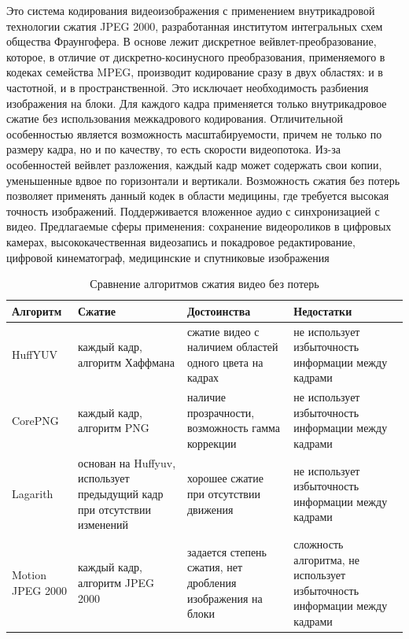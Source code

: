 \begin{itemize}
\begin{enumerate}
Это система кодирования видеоизображения с применением внутрикадровой технологии сжатия JPEG 2000, 
разработанная институтом интегральных схем общества Фраунгофера. 
В основе лежит дискретное вейвлет-преобразование, которое, в отличие от 
дискретно-косинусного преобразования, применяемого в кодеках семейства MPEG, 
производит кодирование сразу в двух областях: и в частотной, и в пространственной. 
Это исключает необходимость разбиения изображения на блоки. Для каждого кадра 
применяется только внутрикадровое сжатие без использования межкадрового кодирования.
Отличительной особенностью является возможность масштабируемости, 
причем не только по размеру кадра, но и по качеству, 
то есть скорости видеопотока. Из-за особенностей вейвлет разложения, каждый 
кадр может содержать свои копии, уменьшенные вдвое по горизонтали и вертикали.
Возможность сжатия без потерь позволяет применять данный кодек в области медицины, 
где требуется высокая точность изображений.
Поддерживается вложенное аудио с синхронизацией с видео.
Предлагаемые сферы применения: сохранение видеороликов в цифровых камерах, 
высококачественная видеозапись и покадровое редактирование, цифровой кинематограф,
медицинские и спутниковые изображения

\end{enumerate}

\begin{table}[ht]\small
  \caption{Сравнение алгоритмов сжатия видео без потерь}
  \begin{tabular}{|p{2cm}|p{3cm}|p{4.5cm}|p{4.5cm}|}
  \hline
  Алгоритм      & Сжатие & Достоинства & Недостатки \\
  \hline
  HuffYUV  & каждый кадр, алгоритм Хаффмана & сжатие видео с наличием областей одного цвета на кадрах & не использует избыточность информации между кадрами         \\
  \hline
  CorePNG       & каждый кадр, алгоритм PNG & наличие прозрачности, возможность гамма коррекции & не использует избыточность информации между кадрами \\
  \hline
  Lagarith   & основан на Huffyuv, использует предыдущий кадр при отсутствии изменений & хорошее сжатие при отсутствии движения & не использует избыточность информации между кадрами \\
  \hline
  Motion JPEG 2000  & каждый кадр, алгоритм JPEG 2000 & задается степень сжатия, нет дробления изображения на блоки & сложность алгоритма, не использует избыточность информации между кадрами \\
  \hline
  \end{tabular}
  \label{tab:t1}
\end{table}


\end{itemize}
